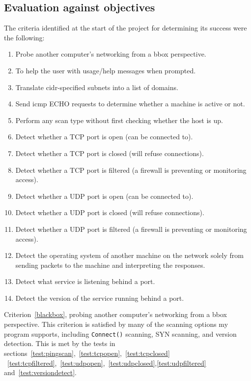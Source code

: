 \documentclass[titlepage]{article}
\let\Oldsubsection\subsection{}
\renewcommand{\subsection}{\FloatBarrier\Oldsubsection}
\begin{document}
\subsection{Evaluation against objectives}

The criteria identified at the start of the project for determining its success were the following:

\begin{enumerate}
  \item{%
    Probe another computer's networking from a \gls{bbox} perspective.
  }
  \item{%
    To help the user with usage/help messages when prompted.  
  }
  \item{%
    Translate \gls{cidr}-specified subnets into a list of domains.
  }
  \item{%
    Send \gls{icmp} ECHO requests to determine whether a machine is active
    or not.
  }
  \item{%
    Perform any scan type without first checking whether the host is up.
  }
  \item{%
    Detect whether a TCP port is open (can be connected to).
  }
  \item{%
    Detect whether a TCP port is closed (will refuse connections).
  }
  \item{%
    Detect whether a TCP port is filtered (a firewall is
    preventing or monitoring access).
  }
  \item{%
    Detect whether a UDP port is open (can be connected to).
  }
  \item{%
    Detect whether a UDP port is closed (will refuse connections).
  }
  \item{%
    Detect whether a UDP port is filtered (a firewall is
    preventing or monitoring access).
  }
  \item{%
    Detect the operating system of another machine on the network
    solely from sending packets to the machine and interpreting the responses.
  }
  \item{%
    Detect what service is listening behind a port.
  }
  \item{%
    Detect the version of the service running behind a port.
  }
\end{enumerate}

Criterion~\ref{blackbox}, probing another computer's networking from a \gls{bbox} perspective.
This criterion is satisfied by many of the scanning options my program supports,
including \verb|Connect()| scanning, SYN scanning, and version detection.
This is met by the tests in sections~\ref{test:pingscan},~\ref{test:tcpopen},~\ref{test:tcpclosed}
~\ref{test:tcpfiltered},~\ref{test:udpopen},~\ref{test:udpclosed},\ref{test:udpfiltered} and~\ref{test:versiondetect}.
\end{document}
